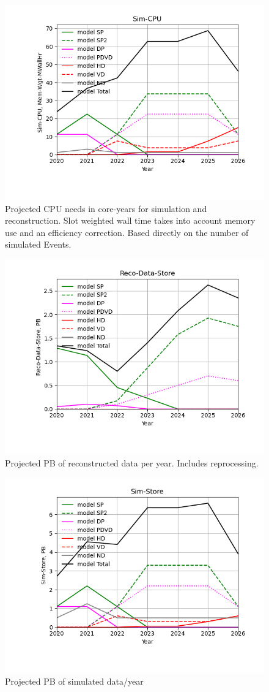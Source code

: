 \begin{figure}[h]
\centering\includegraphics[height=0.4\textwidth]{MoreSim_2022-11-21-2026/MoreSim_2022-11-21-2026-Sim-CPU.png}
\caption{Projected CPU needs in core-years for simulation and reconstruction.              Slot weighted wall time takes into account memory use and an efficiency correction. Based directly on the number of simulated Events.}
\label{fig:Sim-CPU}
\end{figure}
\begin{figure}[h]
\centering\includegraphics[height=0.4\textwidth]{MoreSim_2022-11-21-2026/MoreSim_2022-11-21-2026-Reco-Data-Store.png}
\caption{Projected PB of reconstructed data per year. Includes reprocessing.}
\label{fig:Reco-Data-Store}
\end{figure}
\begin{figure}[h]
\centering\includegraphics[height=0.4\textwidth]{MoreSim_2022-11-21-2026/MoreSim_2022-11-21-2026-Sim-Store.png}
\caption{Projected PB of simulated data/year}
\label{fig:Sim-Store}
\end{figure}
